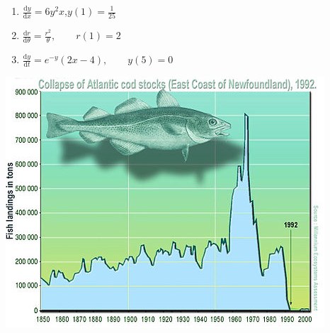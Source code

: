 \begin{enumerate}
\begin{enumerate}
    \item $\frac{\mathrm d y}{\mathrm d x} = 6y^2x$,\qquad $y(1) = \frac{1}{25}$

    \item $\frac{\mathrm d r}{\mathrm d \theta} = \frac{r^2}{\theta},\qquad r(1) = 2 $  

    \item $\frac{\mathrm d y}{\mathrm d t} = e^{-y}(2x-4),\qquad y(5)=0$ 
\end{enumerate}





\clearpage
\centering 
\includegraphics[scale=1.8]{resources/fish.jpeg}


\end{enumerate}
